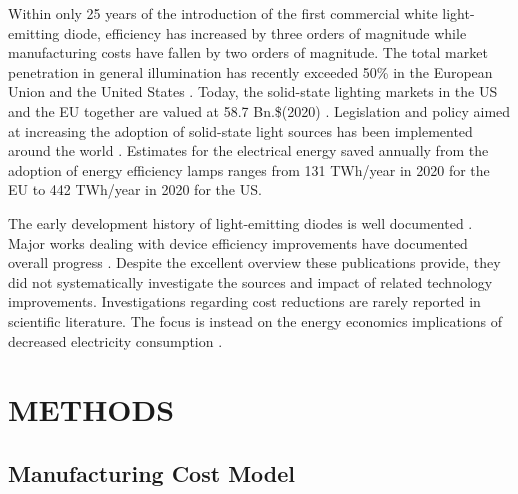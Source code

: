 \documentclass[a4paper,nocompress]{spie}  %
\begin{document}
    Within only 25 years of the introduction of the first commercial white light-emitting diode, efficiency has increased by three orders of magnitude while manufacturing costs have fallen by two orders of magnitude. The total market penetration in general illumination has recently exceeded 50\% in the European Union and the United States \cite{eu2019impactass}\cite{stratunl2018}. Today, the solid-state lighting markets in the US and the EU together are valued at 58.7 Bn.\$(2020) \cite{gvr2020market_us}\cite{gvr2020market_eu}. Legislation and policy aimed at increasing the adoption of solid-state light sources has been implemented around the world \cite{2009-125-EC_regulation-2012_impact}. Estimates for the electrical energy saved annually from the adoption of energy efficiency lamps ranges from 131 TWh/year in 2020 for the EU to 442 TWh/year in 2020 for the US.

    The early development history of light-emitting diodes is well documented \cite{Steigerwald2002}\cite{Nakamura2013}\cite{feezell2018invention}. Major works dealing with device efficiency improvements have documented overall progress \cite{azevedo2009transition}\cite{tsao2010solid}\cite{pattison2017solid}. Despite the excellent overview these publications provide, they did not systematically investigate the sources and impact of related technology improvements. Investigations regarding cost reductions are rarely reported in scientific literature. The focus is instead on the energy economics implications of decreased electricity consumption \cite{tsao2010world}\cite{Tsao2010SSL}. 

\clearpage
\section{METHODS}
\label{sec:methods}

    \subsection{Manufacturing Cost Model}
\end{document}
